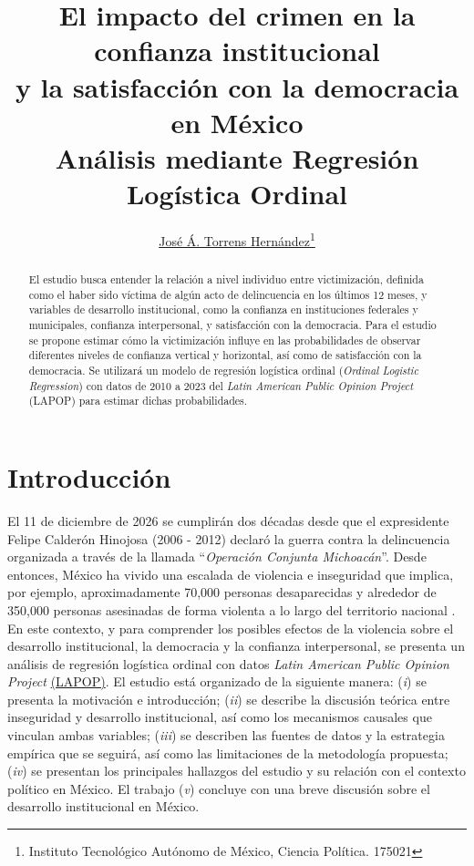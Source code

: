 \documentclass[letterpaper]{article}
\title{\vspace{-2cm}
    {\LARGE El impacto del crimen en la confianza institucional\\y la satisfacción con la democracia en México\\
    \large Análisis mediante Regresión Logística Ordinal}
    }
\author{\Large
  \href{mailto:jose.torrens@itam.mx}{José Á. Torrens Hernández}\footnote{Instituto Tecnológico Autónomo de México, Ciencia Política. 175021}%
}
\date{} %
\begin{document}
\maketitle

\begin{abstract}
\noindent
El estudio busca entender la relación a nivel individuo entre victimización, definida como el haber sido víctima de algún acto de delincuencia en los últimos 12 meses, y variables de desarrollo institucional, como la confianza en instituciones federales y municipales, confianza interpersonal, y satisfacción con la democracia. Para el estudio se propone estimar cómo la victimización influye en las probabilidades de observar diferentes niveles de confianza vertical y horizontal, así como de satisfacción con la democracia. Se utilizará un modelo de regresión logística ordinal (\emph{Ordinal Logistic Regression}) con datos de 2010 a 2023 del \emph{Latin American Public Opinion Project} (LAPOP) para estimar dichas probabilidades.
\noindent
\end{abstract}


\tableofcontents

\vspace{.5cm}


\section{Introducción}

El 11 de diciembre de 2026 se cumplirán dos décadas desde que el expresidente Felipe Calderón Hinojosa (2006 - 2012) declaró la guerra contra la delincuencia organizada a través de la llamada “\emph{Operación Conjunta Michoacán}”. Desde entonces, México ha vivido una escalada de violencia e inseguridad que implica, por ejemplo, aproximadamente 70,000 personas desaparecidas y alrededor de 350,000 personas asesinadas de forma violenta a lo largo del territorio nacional \autocite{pardo2021}.\\[-1.5em]

En este contexto, y para comprender los posibles efectos de la violencia sobre el desarrollo institucional, la democracia y la confianza interpersonal, se presenta un análisis de regresión logística ordinal \autocite{barlaz2024, McNulty, kurz} con datos \emph{Latin American Public Opinion Project} \href{https://www.vanderbilt.edu/lapop/}{(LAPOP)}. El estudio está organizado de la siguiente manera: (\emph{i}) se presenta la motivación e introducción; (\emph{ii}) se describe la discusión teórica entre inseguridad y desarrollo institucional, así como los mecanismos causales que vinculan ambas variables; (\emph{iii}) se describen las fuentes de datos y la estrategia empírica que se seguirá, así como las limitaciones de la metodología propuesta; (\emph{iv}) se presentan los principales hallazgos del estudio y su relación con el contexto político en México. El trabajo (\emph{v}) concluye con una breve discusión sobre el desarrollo institucional en México.\\[-1.5em]
\end{document}
